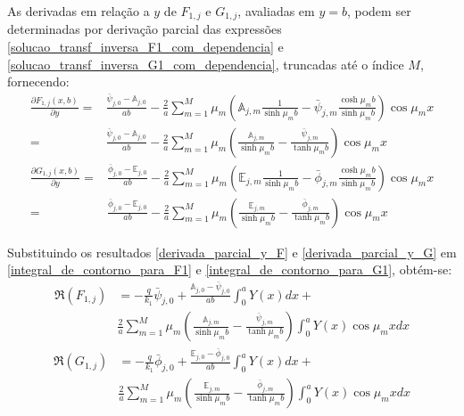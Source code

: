 As derivadas em relação a $y$ de $F_{1,j}$ e $G_{1,j}$, avaliadas em $y = b$, podem ser determinadas por derivação parcial das expressões \eqref{solucao_transf_inversa_F1_com_dependencia} e
\eqref{solucao_transf_inversa_G1_com_dependencia}, truncadas até o índice $M$, fornecendo:
%
\begin{align}
\frac{\partial F_{1, j}(x, b)}{\partial y} = & \frac{\bar{\psi}_{j,0} - \mathbb{A}_{j,0}}{ab} - 
\frac{2}{a}\sum_{m=1}^M \mu_m \left(\mathbb{A}_{j,m}\frac{1}{\sinh\mu_m b} - \bar{\psi}_{j, m}\frac{\cosh\mu_m b}{\sinh\mu_m b}\right)\cos\mu_m x \nonumber \\
= & \frac{\bar{\psi}_{j,0} - \mathbb{A}_{j,0}}{ab} - 
\frac{2}{a}\sum_{m=1}^M \mu_m \left(\frac{\mathbb{A}_{j,m}}{\sinh\mu_m b} - \frac{\bar{\psi}_{j, m}}{\tanh\mu_m b}\right)\cos\mu_m x
\label{derivada_parcial_y_F}
\end{align}
%
\begin{align}
\frac{\partial G_{1, j}(x, b)}{\partial y} = & \frac{\bar{\phi}_{j,0} - \mathbb{E}_{j,0}}{ab} - 
\frac{2}{a}\sum_{m=1}^M \mu_m \left(\mathbb{E}_{j,m}\frac{1}{\sinh\mu_m b} - \bar{\phi}_{j, m}\frac{\cosh\mu_m b}{\sinh\mu_m b}\right)\cos\mu_m x \nonumber \\
= & \frac{\bar{\phi}_{j,0} - \mathbb{E}_{j,0}}{ab} - 
\frac{2}{a}\sum_{m=1}^M \mu_m \left(\frac{\mathbb{E}_{j,m}}{\sinh\mu_m b} - \frac{\bar{\phi}_{j, m}}{\tanh\mu_m b}\right)\cos\mu_m x
\label{derivada_parcial_y_G}
\end{align}

Substituindo os resultados \eqref{derivada_parcial_y_F} e \eqref{derivada_parcial_y_G} em \eqref{integral_de_contorno_para_F1} e \eqref{integral_de_contorno_para_G1}, obtém-se:
\begin{align}
\Re(F_{1,j})
& =
-\frac{q}{k_1}\bar{\psi}_{j,0} + \frac{\mathbb{A}_{j,0} - \bar{\psi}_{j,0}}{ab}\int_0^a Y(x)dx + \nonumber \\
& \frac{2}{a}\sum_{m=1}^M \mu_m \left(\frac{\mathbb{A}_{j,m}}{\sinh\mu_m b} - \frac{\bar{\psi}_{j, m}}{\tanh\mu_m b}\right)\int_0^a Y(x)\cos\mu_m x dx
\label{calculo_FR_F1_antes}
\end{align}
%
\begin{align}
\Re(G_{1,j})
& =
-\frac{q}{k_1}\bar{\phi}_{j,0} + \frac{\mathbb{E}_{j,0} - \bar{\phi}_{j,0}}{ab}\int_0^a Y(x)dx + \nonumber \\
& \frac{2}{a}\sum_{m=1}^M \mu_m \left(\frac{\mathbb{E}_{j,m}}{\sinh\mu_m b} - \frac{\bar{\phi}_{j, m}}{\tanh\mu_m b}\right)\int_0^a Y(x)\cos\mu_m x dx
\label{calculo_FR_G1_antes}
\end{align}


